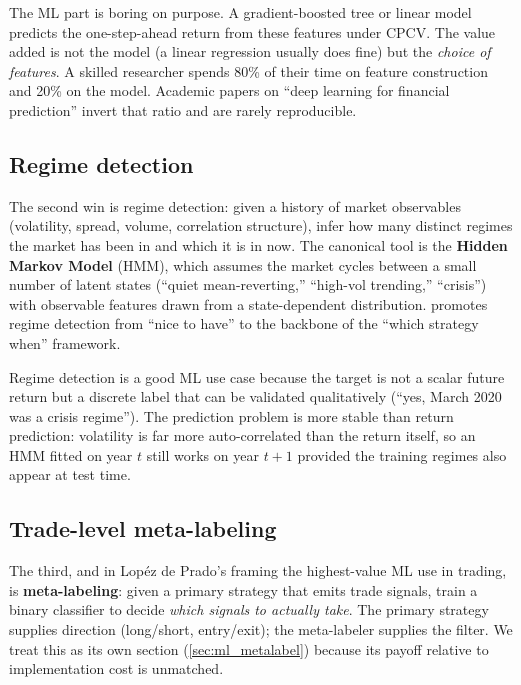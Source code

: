 The ML part is boring on purpose. A gradient-boosted tree or linear
model predicts the one-step-ahead return from these features under
CPCV. The value added is not the model (a linear regression
usually does fine) but the \emph{choice of features}. A skilled
researcher spends 80\% of their time on feature construction and
20\% on the model. Academic papers on ``deep learning for financial
prediction'' invert that ratio and are rarely reproducible.

\subsection{Regime detection}
\label{subsec:ml_regime}

The second win is regime detection: given a history of market
observables (volatility, spread, volume, correlation structure),
infer how many distinct regimes the market has been in and which it
is in now. The canonical tool is the \textbf{Hidden Markov Model}
(HMM), which assumes the market cycles between a small number of
latent states (``quiet mean-reverting,'' ``high-vol trending,''
``crisis'') with observable features drawn from a state-dependent
distribution.  promotes regime detection
from ``nice to have'' to the backbone of the ``which strategy when''
framework.

Regime detection is a good ML use case because the target is not a
scalar future return but a discrete label that can be validated
qualitatively (``yes, March 2020 was a crisis regime''). The
prediction problem is more stable than return prediction: volatility
is far more auto-correlated than the return itself, so an HMM
fitted on year $t$ still works on year $t+1$ provided the training
regimes also appear at test time.

\subsection{Trade-level meta-labeling}
\label{subsec:ml_metalabel_intro}

The third, and in Lop\'ez de Prado's framing the highest-value
ML use in trading, is \textbf{meta-labeling}: given a primary
strategy that emits trade signals, train a binary classifier to
decide \emph{which signals to actually take}. The primary strategy
supplies direction (long/short, entry/exit); the meta-labeler
supplies the filter. We treat this as its own section
(\cref{sec:ml_metalabel}) because its payoff relative to
implementation cost is unmatched.

